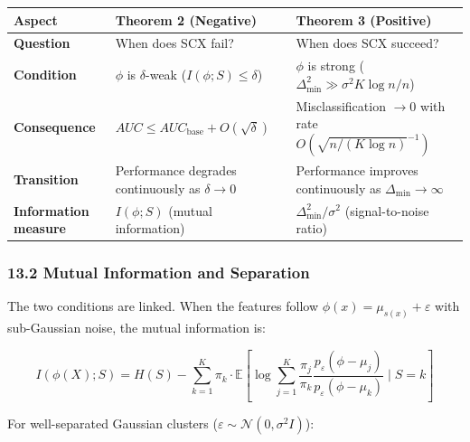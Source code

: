 \documentclass[
  12pt,
]{article}
\begin{document}
\begin{longtable}[]{@{}
  >{\raggedright\arraybackslash}p{}
  >{\raggedright\arraybackslash}p{}
  >{\raggedright\arraybackslash}p{}@{}}
\toprule\noalign{}
\begin{minipage}[b]{\linewidth}\raggedright
Aspect
\end{minipage} & \begin{minipage}[b]{\linewidth}\raggedright
Theorem 2 (Negative)
\end{minipage} & \begin{minipage}[b]{\linewidth}\raggedright
Theorem 3 (Positive)
\end{minipage} \\
\midrule\noalign{}
\endhead
\bottomrule\noalign{}
\endlastfoot
\textbf{Question} & When does SCX fail? & When does SCX succeed? \\
\textbf{Condition} & \(\phi\) is \(\delta\)-weak
(\(I(\phi; S) \leq \delta\)) & \(\phi\) is strong
(\(\Delta_{\min}^2 \gg \sigma^2 K \log n / n\)) \\
\textbf{Consequence} & \(AUC \leq AUC_{\text{base}} + O(\sqrt{\delta})\)
& Misclassification \(\to 0\) with rate
\(O(\sqrt{n/(K\log n)}^{-1})\) \\
\textbf{Transition} & Performance degrades continuously as
\(\delta \to 0\) & Performance improves continuously as
\(\Delta_{\min} \to \infty\) \\
\textbf{Information measure} & \(I(\phi; S)\) (mutual information) &
\(\Delta_{\min}^2 / \sigma^2\) (signal-to-noise ratio) \\
\end{longtable}

\subsubsection{13.2 Mutual Information and
Separation}\label{mutual-information-and-separation}

The two conditions are linked. When the features follow
\(\phi(x) = \mu_{s(x)} + \varepsilon\) with sub-Gaussian noise, the
mutual information is:

\[I(\phi(X); S) = H(S) - \sum_{k=1}^K \pi_k \cdot \mathbb{E}\left[\log \sum_{j=1}^K \frac{\pi_j}{\pi_k} \frac{p_{\varepsilon}(\phi - \mu_j)}{p_{\varepsilon}(\phi - \mu_k)} \mid S = k\right]\]

For well-separated Gaussian clusters
(\(\varepsilon \sim \mathcal{N}(0, \sigma^2 I)\)):
\end{document}
